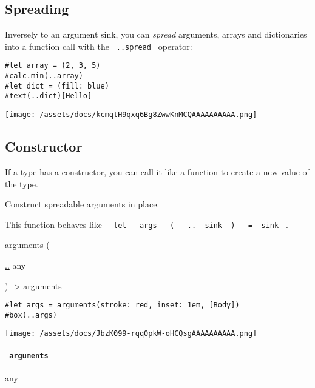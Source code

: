 \subsection{Spreading}\label{spreading}

Inversely to an argument sink, you can \emph{spread} arguments, arrays
and dictionaries into a function call with the \texttt{\ ..spread\ }
operator:

\begin{verbatim}
#let array = (2, 3, 5)
#calc.min(..array)
#let dict = (fill: blue)
#text(..dict)[Hello]
\end{verbatim}

\texttt{[image: /assets/docs/kcmqtH9qxq6Bg8ZwwKnMCQAAAAAAAAAA.png]}

\subsection{\texorpdfstring{Constructor
{}}{Constructor }}\label{constructor}

\label{constructor-constructor-tooltip}
If a type has a constructor, you can call it like a function to create a
new value of the type.

Construct spreadable arguments in place.

This function behaves like
\texttt{\ }{\texttt{\ let\ }}\texttt{\ }{\texttt{\ args\ }}\texttt{\ }{\texttt{\ (\ }}\texttt{\ }{\texttt{\ ..\ }}\texttt{\ sink\ }{\texttt{\ )\ }}\texttt{\ }{\texttt{\ =\ }}\texttt{\ sink\ }
.

{ arguments } (

{ \hyperref[constructor-parameters-arguments]{..} { any } }

) -\textgreater{}
\href{/docs/reference/foundations/arguments/}{arguments}

\begin{verbatim}
#let args = arguments(stroke: red, inset: 1em, [Body])
#box(..args)
\end{verbatim}

\texttt{[image: /assets/docs/JbzK099-rqq0pkW-oHCQsgAAAAAAAAAA.png]}

\paragraph{\texorpdfstring{\texttt{\ arguments\ }}{ arguments }}\label{constructor-arguments}

{ any }

